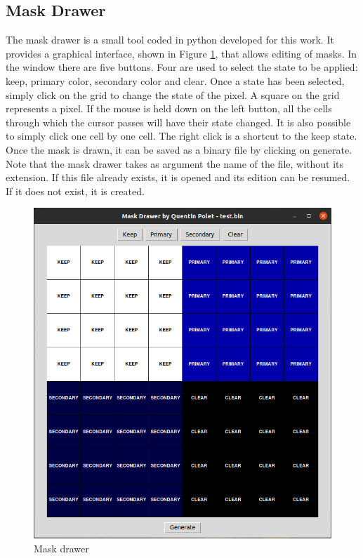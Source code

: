 \subsection{Mask Drawer}

The mask drawer is a small tool coded in python developed for this work. It provides a graphical 
interface, shown in Figure \ref{fig:tools/mask_drawer}, that allows editing of masks. In the window 
there are five buttons. 
Four are used to select the state to be applied: keep, primary color, secondary color and clear. 
Once a state has been selected, simply click on the grid to change the state of the pixel. A square 
on the grid represents a pixel. If the mouse is held down on the left button, all the cells through 
which the cursor passes will have their state changed. It is also possible to simply click one cell 
by one cell. The right click is a shortcut to the keep state. Once the mask is drawn, it can be 
saved as a binary file by clicking on generate. Note that the mask drawer takes as argument the 
name of the file, without its extension. If this file already exists, it is opened and its edition 
can be resumed. If it does not exist, it is created. 

\begin{figure}[H]
    \centering
    \includegraphics[scale=0.5]{Chapter7-Tools-Demos/res/mask_drawer.png}
    \caption{Mask drawer}
    \label{fig:tools/mask_drawer}
\end{figure}

